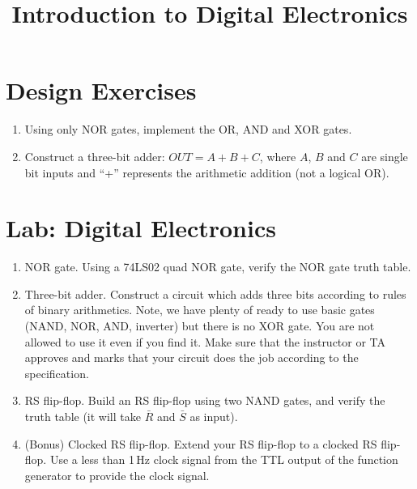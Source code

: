 \documentclass{article}
\title{Introduction to Digital Electronics}
\begin{document}
\maketitle

\section{Design Exercises}

\begin{enumerate}
\item Using only NOR gates, implement the OR, AND and XOR gates.
\item Construct a three-bit adder: $OUT = A + B + C$, where $A$, $B$ and $C$ are single bit inputs and ``+'' represents the arithmetic addition (not a logical OR).
\end{enumerate}

\section{Lab: Digital Electronics}

\begin{enumerate}
\item NOR gate.  Using a 74LS02 quad NOR gate, verify the NOR gate truth table.
\item Three-bit adder.  Construct a circuit which adds three bits according to rules of binary arithmetics. Note, we have plenty of ready to use basic gates (NAND, NOR, AND, inverter) but there is no XOR gate. You are not allowed to use it even if you find it.  Make sure that the instructor or TA approves and marks that your circuit does the job according to the specification.
\item RS flip-flop.  Build an RS flip-flop using two NAND gates, and verify the truth table (it will take $\bar{R}$ and $\bar{S}$ as input).
\item (Bonus) Clocked RS flip-flop. Extend your RS flip-flop to a clocked RS flip-flop. Use a less than 1\,Hz clock signal from the TTL output of the function generator to provide the clock signal.
\end{enumerate}
\end{document}
